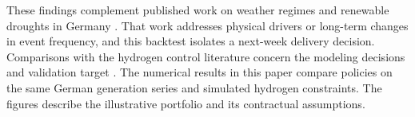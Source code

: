 These findings complement published work on weather regimes and renewable droughts in Germany \citep{mockert2023,strnad2026}. That work addresses physical drivers or long-term changes in event frequency, and this backtest isolates a next-week delivery decision. Comparisons with the hydrogen control literature concern the modeling decisions and validation target \citep{zhao2026}. The numerical results in this paper compare policies on the same German generation series and simulated hydrogen constraints. The figures describe the illustrative portfolio and its contractual assumptions.
